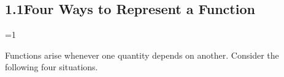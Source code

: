 \documentclass{sebase}
\begin{document}
\chapter[1\quad Functions and Models]{}

\section{1.1\quad Four Ways to Represent a Function}

\noCCC%
\setET%
\renewcommand{\RM}{0}%
\renewcommand{\RM}{1}%
\ifnum\RM=1 \setcounter{page}{2}\else \setcounter{page}{2}\fi%

Functions arise whenever one quantity depends on another. Consider the
following four situations.
\end{document}
